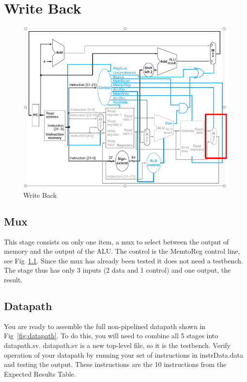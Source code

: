 \chapter{Write Back}


\begin{figure}
\caption{Write Back}\label{fig:wb}
\begin{center}
\includegraphics[width=\textwidth]{../images/writeback_stage.png}
\end{center}
\end{figure}

\WrapBarrier

\section{Mux}
This stage consists on only one item, a mux to select between the output of memory and the output of the ALU.  The control is the MemtoReg control line, see Fig~\ref{fig:wb}.  Since the mux has already been tested it does not need a testbench.  The stage thus has only 3 inputs (2 data and 1 control) and one output, the result.

\section{Datapath}
You are ready to assemble the full non-pipelined datapath shown in Fig~\ref{fig:datapath}.  To do this, you will need to combine all 5 stages into datapath.sv.  datapath.sv is a new top-level file, so it is the testbench.  Verify operation of your datapath by running your set of instructions in instrData.data and testing the output.  These instructions are the 10 instructions from the Expected Results Table.  

